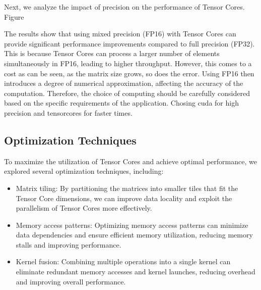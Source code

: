 \documentclass[conference]{IEEEtran}
\begin{document}
  Next, we analyze the impact of precision on the performance of Tensor Cores. Figure %
  
  \begin{figure}[htbp]
  \end{figure}
  
  The results show that using mixed precision (FP16) with Tensor Cores can provide significant performance improvements compared to full precision (FP32).
  This is because Tensor Cores can process a larger number of elements simultaneously in FP16,
  leading to higher throughput. However, this comes to a cost as can be seen, as the matrix size grows, so does the error.
  Using FP16 then introduces a degree of numerical approximation, affecting the accuracy of the computation.
  Therefore, the choice of computing should be carefully considered based on the specific
  requirements of the application. Chosing cuda for high precision and tensorcores for faster times.
  
  \subsection{Optimization Techniques}\label{sec:optimization-techniques}
  
  To maximize the utilization of Tensor Cores and achieve optimal performance, we explored several optimization techniques, including:
  
  \begin{itemize}
    \item Matrix tiling: By partitioning the matrices
    into smaller tiles that fit the Tensor Core dimensions, we can improve data locality 
    and exploit the parallelism of Tensor Cores more effectively.
    \item Memory access patterns: Optimizing memory access patterns can minimize data 
    dependencies and ensure efficient memory utilization, reducing memory stalls and improving 
    performance.
    \item Kernel fusion: Combining multiple operations into a single kernel can eliminate 
    redundant memory accesses and kernel launches, reducing overhead and improving overall performance.
    
  \end{itemize}
  
\end{document}
